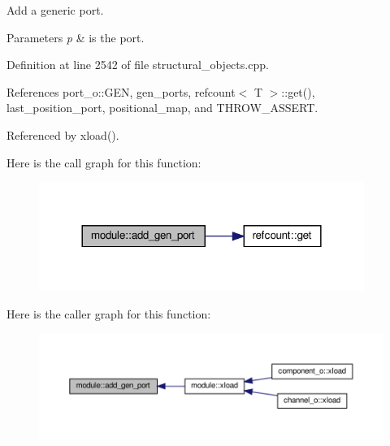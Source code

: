 Add a generic port. 


\begin{DoxyParams}{Parameters}
{\em p} & is the port. \\
\hline
\end{DoxyParams}


Definition at line 2542 of file structural\+\_\+objects.\+cpp.



References port\+\_\+o\+::\+G\+EN, gen\+\_\+ports, refcount$<$ T $>$\+::get(), last\+\_\+position\+\_\+port, positional\+\_\+map, and T\+H\+R\+O\+W\+\_\+\+A\+S\+S\+E\+RT.



Referenced by xload().

Here is the call graph for this function\+:
\nopagebreak
\begin{figure}[H]
\begin{center}
\leavevmode
\includegraphics[width=300pt]{d0/dd3/classmodule_aab9694a0d46f17a42a2dc52200414677_cgraph}
\end{center}
\end{figure}
Here is the caller graph for this function\+:
\nopagebreak
\begin{figure}[H]
\begin{center}
\leavevmode
\includegraphics[width=350pt]{d0/dd3/classmodule_aab9694a0d46f17a42a2dc52200414677_icgraph}
\end{center}
\end{figure}
\mbox{\label{classmodule_a4faf421d00ba2c16a003d6ef6ae41d75}} 
